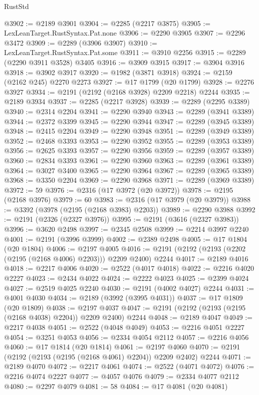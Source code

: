\begin{lexlean}{RustStd}
\begin{coremodule}
@3902 := @2189 @3901
@3904 := @2285 (@2217 @3875)
@3905 := LexLeanTarget.RustSyntax.Pat.none
@3906 := @2290 @3905
@3907 := @2296 @3472
@3909 := @2289 (@3906 @3907)
@3910 := LexLeanTarget.RustSyntax.Pat.some
@3911 := @3910 @2256
@3915 := @2289 (@2290 @3911 @3528) @3405
@3916 := @3909 @3915
@3917 := @3904 @3916
@3918 := @3902 @3917
@3920 := @1982 (@3871 @3918)
@3924 := @2159 (@2162 @245) @2270 @2273
@3927 := @17 @1799 (@20 @1799)
@3928 := @2276 @3927
@3934 := @2191 (@2192 (@2168 @3928) @2209 @2218) @2244
@3935 := @2189 @3934
@3937 := @2285 (@2217 @3928)
@3939 := @2289 (@2295 @3389)
@3940 := @2314 @2204
@3941 := @2290 @3940
@3943 := @2289 (@3941 @3389)
@3944 := @2372 @3399
@3945 := @2290 @3944
@3947 := @2289 (@3945 @3389)
@3948 := @2415 @2204
@3949 := @2290 @3948
@3951 := @2289 (@3949 @3389)
@3952 := @2468 @3393
@3953 := @2290 @3952
@3955 := @2289 (@3953 @3389)
@3956 := @2625 @3393
@3957 := @2290 @3956
@3959 := @2289 (@3957 @3389)
@3960 := @2834 @3393
@3961 := @2290 @3960
@3963 := @2289 (@3961 @3389)
@3964 := @3027 @3400
@3965 := @2290 @3964
@3967 := @2289 (@3965 @3389)
@3968 := @3350 @2204
@3969 := @2290 @3968
@3971 := @2289 (@3969 @3389)
@3972 := 59
@3976 := @2316 (@17 @3972 (@20 @3972))
@3978 := @2195 (@2168 @3976)
@3979 := 60
@3983 := @2316 (@17 @3979 (@20 @3979))
@3988 := @3392 (@3978 (@2195 (@2168 @3983) @2203))
@3989 := @2290 @3988
@3992 := @2191 (@2326 (@2327 @3976))
@3995 := @2191 (@3616 (@2327 @3983))
@3996 := @3620 @2498
@3997 := @2345 @2508
@3999 := @2214 @3997 @2240
@4001 := @2191 (@3996 @3999)
@4002 := @2389 @2498
@4005 := @17 @1804 (@20 @1804)
@4006 := @2197 @4005
@4016 := @2191 (@2192 (@2193 (@2202 (@2195 (@2168 @4006) @2203))) @2209 @2400) @2244
@4017 := @2189 @4016
@4018 := @2217 @4006
@4020 := @2522 (@4017 @4018)
@4022 := @2216 @4020 @2227
@4023 := @2434 @4022
@4024 := @2222 @4023
@4025 := @2399 @4024
@4027 := @2519 @4025 @2240
@4030 := @2191 (@4002 @4027) @2244
@4031 := @4001 @4030
@4034 := @2189 (@3992 (@3995 @4031))
@4037 := @17 @1809 (@20 @1809)
@4038 := @2197 @4037
@4047 := @2191 (@2192 (@2193 (@2195 (@2168 @4038) @2204)) @2209 @2400) @2244
@4048 := @2189 @4047
@4049 := @2217 @4038
@4051 := @2522 (@4048 @4049)
@4053 := @2216 @4051 @2227
@4054 := @3251 @4053
@4056 := @2334 @4054 @2112
@4057 := @2216 @4056
@4060 := @17 @1814 (@20 @1814)
@4061 := @2197 @4060
@4070 := @2191 (@2192 (@2193 (@2195 (@2168 @4061) @2204)) @2209 @2402) @2244
@4071 := @2189 @4070
@4072 := @2217 @4061
@4074 := @2522 (@4071 @4072)
@4076 := @2216 @4074 @2227
@4077 := @4057 @4076
@4079 := @2334 @4077 @2112
@4080 := @2297 @4079
@4081 := 58
@4084 := @17 @4081 (@20 @4081)

\end{coremodule}
\end{lexlean}
